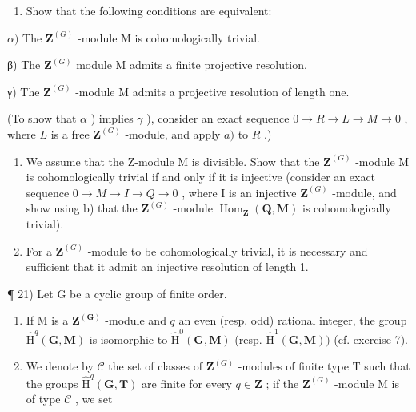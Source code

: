 \begin{enumerate}
\def\labelenumi{\alph{enumi})}
\setcounter{enumi}{1}
\tightlist
\item
  Show that the following conditions are equivalent:
\end{enumerate}

\(\alpha)\) The \(\mathbf{Z}^{(G)}\) -module M is cohomologically trivial.

β) The \(\mathbf{Z}^{(G)}\) module M admits a finite projective resolution.

γ) The \(\mathbf{Z}^{(G)}\) -module M admits a projective resolution of length one.

(To show that \(\alpha\) ) implies \(\gamma\) ), consider an exact sequence \(0 \to R \to L \to M \to 0\) , where \(L\) is a free \(\mathbf{Z}^{(G)}\) -module, and apply \(a)\) to \(R\) .)

\begin{enumerate}
\def\labelenumi{\alph{enumi})}
\setcounter{enumi}{2}
\item
  We assume that the Z-module M is divisible. Show that the \(\mathbf{Z}^{(G)}\) -module M is cohomologically trivial if and only if it is injective (consider an exact sequence \(0 \rightarrow M \rightarrow I \rightarrow Q \rightarrow 0\) , where I is an injective \(\mathbf{Z}^{(G)}\) -module, and show using b) that the \(\mathbf{Z}^{(G)}\) -module \(\operatorname{Hom}_{\mathbf{Z}}(\mathbf{Q}, \mathbf{M})\) is cohomologically trivial).
\item
  For a \(\mathbf{Z}^{(G)}\) -module to be cohomologically trivial, it is necessary and sufficient that it admit an injective resolution of length 1.
\end{enumerate}

¶ 21) Let G be a cyclic group of finite order.

\begin{enumerate}
\def\labelenumi{\alph{enumi})}
\item
  If M is a \(\mathbf{Z}^{(\mathbf{G})}\) -module and \(q\) an even (resp. odd) rational integer, the group \(\hat{\mathrm{H}}^q (\mathbf{G},\mathbf{M})\) is isomorphic to \(\hat{\mathrm{H}}^0 (\mathbf{G},\mathbf{M})\) (resp. \(\hat{\mathrm{H}}^1 (\mathbf{G},\mathbf{M}))\) (cf. exercise 7).
\item
  We denote by \(\mathcal{C}\) the set of classes of \(\mathbf{Z}^{(G)}\) -modules of finite type T such that the groups \(\hat{\mathrm{H}}^q (\mathbf{G},\mathbf{T})\) are finite for every \(q\in \mathbf{Z}\) ; if the \(\mathbf{Z}^{(G)}\) -module M is of type \(\mathcal{C}\) , we set
\end{enumerate}

